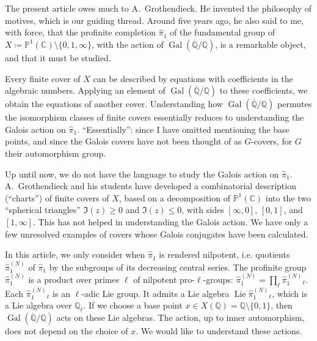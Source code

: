 \documentclass{article}
\theoremstyle{definition}
\newcommand{\bb}{\mathbb}
\newcommand{\PP}{\bb{P}}
\newcommand{\CC}{\bb{C}}
\newcommand{\QQ}{\bb{Q}}
\newcommand{\cQQ}{\overline{\QQ}}
\renewcommand{\geq}{\geqslant}
\renewcommand{\leq}{\leqslant}
\DeclareMathOperator{\Gal}{Gal}
\DeclareMathOperator{\Lie}{Lie}
\begin{document}
\section*{}

The present article owes much to A.~Grothendieck.
He invented the philosophy of motives, which is our guiding thread.
Around five years ago, he also said to me, with force, that the profinite completion $\hat{\pi}_1$ of the fundamental group of $X\coloneqq\PP^1(\CC)\setminus\{0,1,\infty\}$, with the action of $\Gal(\cQQ/\QQ)$, is a remarkable object, and that it must be studied.

Every finite cover of $X$ can be described by equations with coefficients in the algebraic numbers.
Applying an element of $\Gal(\cQQ/\QQ)$ to these coefficients, we obtain the equations of another cover.
Understanding how $\Gal(\cQQ/\QQ)$ permutes the isomorphism classes of finite covers essentially reduces to understanding the Galois action on $\hat{\pi}_1$.
``Essentially'': since I have omitted mentioning the base points, and since the Galois covers have not been thought of as $G$-covers, for $G$ their automorphism group.

Up until now, we do not have the language to study the Galois action on $\hat{\pi}_1$.
A.~Grothendieck and his students have developed a combinatorial description (``charts'') of finite covers of $X$, based on a decomposition of $\PP^1(\CC)$ into the two ``spherical triangles'' $\Im(z)\geq0$ and $\Im(z)\leq0$, with sides $[\infty,0]$, $[0,1]$, and $[1,\infty]$.
This has not helped in understanding the Galois action.
We have only a few unresolved examples of covers whose Galois conjugates have been calculated.

In this article, we only consider when $\hat{\pi}_1$ is rendered nilpotent, i.e. quotients $\hat{\pi}_1^{(N)}$ of $\hat{\pi}_1$ by the subgroups of its decreasing central series.
The profinite group $\hat{\pi}_1^{(N)}$ is a product over primes $\ell$ of nilpotent pro-$\ell$-groups: $\hat{\pi}_1^{(N)} = \prod_\ell \hat{\pi}_1^{(N)}{}\!_\ell$.
Each $\hat{\pi}_1^{(N)}{}\!_\ell$ is an $\ell$-adic Lie group.
It admits a Lie algebra $\Lie\hat{\pi}_1^{(N)}{}\!_\ell$, which is a Lie algebra over $\QQ_\ell$.
If we choose a base point $x\in X(\QQ)=\QQ\setminus\{0,1\}$, then $\Gal(\cQQ/\QQ)$ acts on these Lie algebras.
The action, up to inner automorphism, does not depend on the choice of $x$.
We would like to understand these actions.
\end{document}
